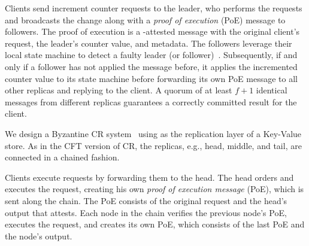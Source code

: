 
Clients send increment counter requests to the leader, who performs the requests and broadcasts the change along with a {\em proof of execution} (PoE) message to followers. The proof of execution is a \projecttitle{}-attested message with the original client's request, the leader's counter value, and metadata. The followers leverage their local state machine to detect a faulty leader (or follower)~\cite{268272}. Subsequently,
if and only if a follower has not applied the message before, it applies the incremented counter value to its state machine before forwarding its own PoE message to all other replicas and replying to the client.
A quorum of at least $f+1$ identical messages from different replicas guarantees a correctly committed result for the client. %

We design a Byzantine CR system~\cite{10.1007/978-3-642-35476-2_24} using \projecttitle{} as the replication layer of a Key-Value store. As in the CFT version of CR, the replicas, e.g., head, middle, and tail, are connected in a chained fashion. 

Clients execute requests by forwarding them to the head. The head orders and executes the request, creating his own {\em proof of execution message} (PoE), which is sent along the chain. The PoE consists of the original request and the head's output that \projecttitle{} attests. Each node in the chain verifies the previous node's PoE, executes the request, and creates its own PoE, which consists of the last PoE and the node's output. 

